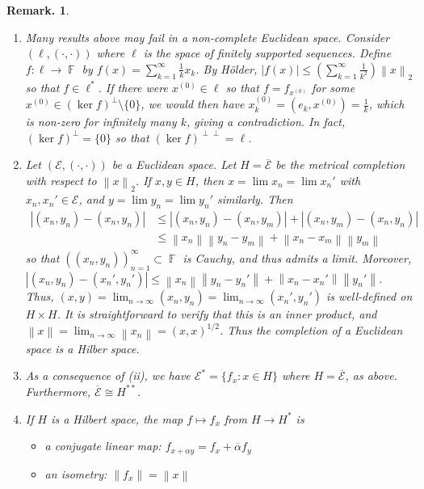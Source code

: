\documentclass[11pt, a4paper]{memoir}
\DeclareMathOperator{\F}{{\mathbb{F}}}
\newcommand{\norm}[1]{\ensuremath{\left\lVert#1\right\rVert}}
\theoremstyle{change}
\theoremstyle{plain}
\theoremstyle{nonumberplain}
\newtheorem{remark}{Remark.}
\newcommand{\inr}[1]{\ensuremath{\left(#1\right)}}
\numberwithin{equation}{section}
\begin{document}
\begin{remark}
    \begin{enumerate}[nl,r]
        \item Many results above may fail in a non-complete Euclidean space.
            Consider $(\ell,\inr{\cdot,\cdot})$ where $\ell$ is the space of finitely supported sequences.
            Define $f:\ell\to\F$ by $f(x)=\sum_{k=1}^\infty\frac{1}{k}x_k$.
            By Hölder, $|f(x)|\leq\left(\sum_{k=1}^\infty\frac{1}{k^2}\right)\norm{x}_2$ so that $f\in\ell^*$.
            If there were $x^{(0)}\in\ell$ so that $f=f_{x^{(0)}}$ for some $x^{(0)}\in(\ker f)^\perp\setminus\{0\}$, we would then have $x_k^{(0)}=(e_k,x^{(0)})=\frac{1}{k}$, which is non-zero for infinitely many $k$, giving a contradiction.
            In fact, $(\ker f)^{\perp}=\{0\}$ so that $(\ker f)^{\perp\perp}=\ell$.
        \item Let $(\mathcal{E},\inr{\cdot,\cdot})$ be a Euclidean space.
            Let $H=\overline{\mathcal{E}}$ be the metrical completion with respect to $\norm{x}_2$.
            If $x,y\in H$, then $x=\lim x_n=\lim x_n'$ with $x_n,x_n'\in\mathcal{E}$, and $y=\lim y_n=\lim y_n'$ similarly.
            Then
            \begin{align*}
                \left\lvert\inr{x_n,y_n}-\inr{x_n,y_n}\right\rvert&\leq |\inr{x_n,y_n}-\inr{x_n,y_m}|+|\inr{x_n,y_m}-\inr{x_n,y_n}|\\
                                                                  &\leq\norm{x_n}\norm{y_n-y_m}+\norm{x_n-x_m}\norm{y_m}
            \end{align*}
            so that $(\inr{x_n,y_n})_{n=1}^\infty\subset\F$ is Cauchy, and thus admits a limit.
            Moreover, $|\inr{x_n,y_n}-\inr{x_n',y_n'}|\leq\norm{x_n}\norm{y_n-y_n'}+\norm{x_n-x_n'}\norm{y_n'}$.
            Thus, $\inr{x,y}=\lim_{n\to\infty}\inr{x_n,y_n}=\lim_{n\to\infty}\inr{x_n',y_n'}$ is well-defined on $H\times H$.
            It is straightforward to verify that this is an inner product, and $\norm{x}=\lim_{n\to\infty}\norm{x_n}=\inr{x,x}^{1/2}$.
            Thus the completion of a Euclidean space is a Hilber space.
        \item As a consequence of (ii), we have $\mathcal{E}^*=\{f_x:x\in H\}$ where $H=\overline{\mathcal{E}}$, as above.
            Furthermore, $\overline{\mathcal{E}}\cong H^{**}$.
        \item If $H$ is a Hilbert space, the map $f\mapsto f_x$ from $H\to H^*$ is
            \begin{itemize}[nl]
                \item a conjugate linear map: $f_{x+\alpha y}=f_x+\overline{\alpha}f_y$
                \item an isometry: $\norm{f_x}=\norm{x}$
            \end{itemize}
    \end{enumerate}
\end{remark}
\end{document}
